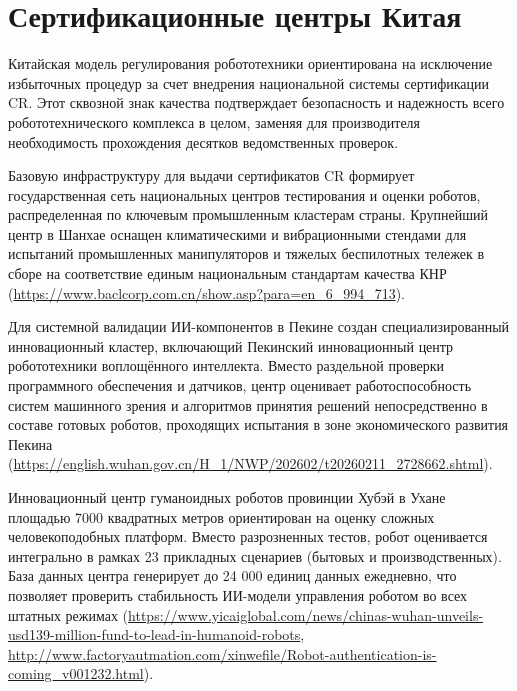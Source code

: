 \newpage
\section{Сертификационные центры Китая}

Китайская модель регулирования робототехники ориентирована на исключение избыточных процедур за счет внедрения национальной системы сертификации CR. Этот сквозной знак качества подтверждает безопасность и надежность всего робототехнического комплекса в целом, заменяя для производителя необходимость прохождения десятков ведомственных проверок.

Базовую инфраструктуру для выдачи сертификатов CR формирует государственная сеть национальных центров тестирования и оценки роботов, распределенная по ключевым промышленным кластерам страны. Крупнейший центр в Шанхае оснащен климатическими и вибрационными стендами для испытаний промышленных манипуляторов и тяжелых беспилотных тележек в сборе на соответствие единым национальным стандартам качества КНР (\url{https://www.baclcorp.com.cn/show.asp?para=en_6_994_713}).

Для системной валидации ИИ-компонентов в Пекине создан специализированный инновационный кластер, включающий Пекинский инновационный центр робототехники воплощённого интеллекта. Вместо раздельной проверки программного обеспечения и датчиков, центр оценивает работоспособность систем машинного зрения и алгоритмов принятия решений непосредственно в составе готовых роботов, проходящих испытания в зоне экономического развития Пекина (\url{https://english.wuhan.gov.cn/H_1/NWP/202602/t20260211_2728662.shtml}).

Инновационный центр гуманоидных роботов провинции Хубэй в Ухане площадью 7000 квадратных метров ориентирован на оценку сложных человекоподобных платформ. Вместо разрозненных тестов, робот оценивается интегрально в рамках 23 прикладных сценариев (бытовых и производственных). База данных центра генерирует до 24 000 единиц данных ежедневно, что позволяет проверить стабильность ИИ-модели управления роботом во всех штатных режимах (\url{https://www.yicaiglobal.com/news/chinas-wuhan-unveils-usd139-million-fund-to-lead-in-humanoid-robots}, \url{http://www.factoryautmation.com/xinwefile/Robot-authentication-is-coming_v001232.html}).

